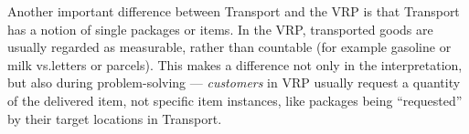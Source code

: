 
Another important difference between Transport and the VRP is that Transport has a notion of single packages or items. In the VRP, transported goods are usually regarded as measurable, rather than countable (for example gasoline or milk vs.\;letters or parcels). This makes a difference not only in the
interpretation, but also during problem-solving --- \textit{customers} in VRP usually request
a quantity of the delivered item, not specific item instances, like packages being ``requested''
by their target locations in Transport.
